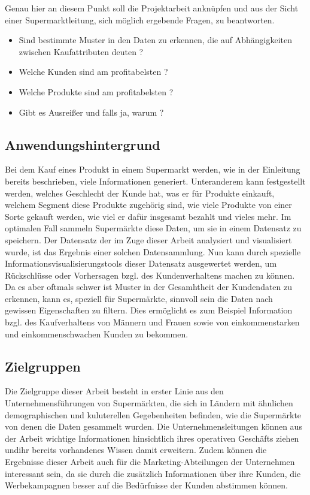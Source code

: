 \documentclass[usegeometry=true]{scrartcl}
\begin{document}
\noindent Genau hier an diesem Punkt soll die Projektarbeit anknüpfen und aus der Sicht einer Supermarktleitung, sich möglich ergebende Fragen, zu beantworten.

\begin{itemize}
	\item Sind bestimmte Muster in den Daten zu erkennen, die auf Abhängigkeiten zwischen Kaufattributen deuten ?
	\item Welche Kunden sind am profitabelsten ?
	\item Welche Produkte sind am profitabelsten ?
	\item Gibt es Ausreißer und falls ja, warum ?
\end{itemize}

\subsection{Anwendungshintergrund}
Bei dem Kauf eines Produkt in einem Supermarkt werden, wie in der Einleitung bereits beschrieben, viele Informationen generiert. Unteranderem kann festgestellt werden,
welches Geschlecht der Kunde hat, was er für Produkte einkauft, welchem Segment diese Produkte zugehörig sind, wie viele Produkte von einer Sorte gekauft werden,
wie viel er dafür insgesamt bezahlt und vieles mehr. Im optimalen Fall sammeln Supermärkte diese Daten, um sie in einem Datensatz zu speichern.
Der Datensatz der im Zuge dieser Arbeit analysiert und visualisiert wurde, ist das Ergebnis einer solchen Datensammlung. Nun kann durch spezielle
Informationsvisualisierungstools dieser Datensatz ausgewertet werden, um Rückschlüsse oder Vorhersagen bzgl. des Kundenverhaltens machen zu können.
Da es aber oftmals schwer ist Muster in der Gesamhtheit der Kundendaten zu erkennen, kann es, speziell für Supermärkte, sinnvoll sein die Daten nach gewissen Eigenschaften zu
filtern. Dies ermöglicht es zum Beispiel Information bzgl. des Kaufverhaltens von Männern und Frauen sowie von einkommenstarken und einkommenschwachen Kunden zu bekommen.


\subsection{Zielgruppen}
Die Zielgruppe dieser Arbeit besteht in erster Linie aus den Unternehmensführungen von Supermärkten, die sich in Ländern mit ähnlichen demographischen und kuluterellen
Gegebenheiten befinden, wie die Supermärkte von denen die Daten gesammelt wurden. Die Unternehmensleitungen können aus der Arbeit wichtige Informationen hinsichtlich ihres
operativen Geschäfts ziehen undihr bereits vorhandenes Wissen damit erweitern. Zudem können die Ergebnisse dieser Arbeit auch für die Marketing-Abteilungen der Unternehmen
interessant sein, da sie durch die zusätzlich Informationen über ihre Kunden, die Werbekampagnen besser auf die Bedürfnisse der Kunden abstimmen können.
\end{document}

